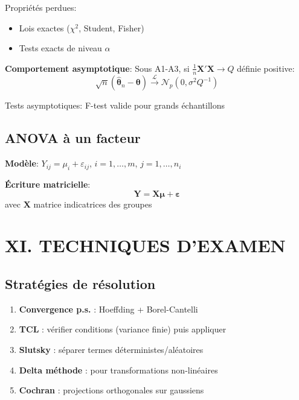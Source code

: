 \documentclass[8pt,twocolumn]{article}
\newcommand{\mydef}[1]{\textcolor{defcolor}{\textbf{#1}}}
\newcommand{\myprop}[1]{\textcolor{propcolor}{\textbf{#1}}}
\newcommand{\myrem}[1]{\textcolor{remcolor}{\textbf{#1}}}
\begin{document}
Propriétés perdues:
\begin{itemize}[nosep]
\item Lois exactes ($\chi^2$, Student, Fisher)
\item Tests exacts de niveau $\alpha$
\end{itemize}

\myprop{Comportement asymptotique}:
Sous A1-A3, si $\frac{1}{n}\mathbf{X}'\mathbf{X} \to Q$ définie positive:
$$\sqrt{n}(\hat{\boldsymbol{\theta}}_n - \boldsymbol{\theta}) \xrightarrow{\mathcal{L}} \mathcal{N}_p(0,\sigma^2 Q^{-1})$$

Tests asymptotiques: F-test valide pour grands échantillons

\subsection{ANOVA à un facteur}
\mydef{Modèle}: $Y_{ij} = \mu_i + \varepsilon_{ij}$, $i=1,\ldots,m$, $j=1,\ldots,n_i$

\mydef{Écriture matricielle}: 
$$\mathbf{Y} = \mathbf{X}\boldsymbol{\mu} + \boldsymbol{\varepsilon}$$
avec $\mathbf{X}$ matrice indicatrices des groupes

\section*{\mydef{XI. TECHNIQUES D'EXAMEN}}

\subsection{\myrem{Stratégies de résolution}}
\begin{enumerate}[nosep]
\item \textbf{Convergence p.s.} : Hoeffding + Borel-Cantelli
\item \textbf{TCL} : vérifier conditions (variance finie) puis appliquer
\item \textbf{Slutsky} : séparer termes déterministes/aléatoires  
\item \textbf{Delta méthode} : pour transformations non-linéaires
\item \textbf{Cochran} : projections orthogonales sur gaussiens
\end{enumerate}
\end{document}
